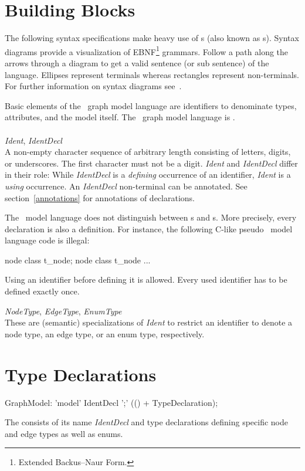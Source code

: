 \section{Building Blocks}
\label{modelbb}

\begin{note}
The following syntax specifications make heavy use of s (also known as s). Syntax diagrams provide a visualization of EBNF\footnote{Extended Backus–Naur Form.} grammars. Follow a path along the arrows through a diagram to get a valid sentence (or sub sentence) of the language. Ellipses represent terminals whereas rectangles represent non-terminals. For further information on syntax diagrams see~\cite{MMJW:91}.
\end{note}
Basic elements of the \GrG\ graph model language are identifiers to denominate types, attributes, and the model itself. The \GrG\ graph model language is .\\
\\
\emph{Ident}, \emph{IdentDecl}\\ \nopagebreak
A non-empty character sequence of arbitrary length consisting of letters, digits, or underscores. The first character must not be a digit. \emph{Ident} and \emph{IdentDecl} differ in their role: While \emph{IdentDecl} is a \emph{defining} occurrence of an identifier, \emph{Ident} is a \emph{using} occurrence. An \emph{IdentDecl} non-terminal can be annotated. See section~\ref{annotations} for annotations of declarations.
\begin{note}
\label{note:modeldecl}
  The \GrG\ model language does not distinguish between s and s. More precisely, every declaration is also a definition. For instance, the following C-like pseudo \GrG\ model language code is illegal:
\begin{grgen}
node class t_node;
node class t_node {
  ...
}
\end{grgen}
Using an identifier before defining it is allowed. Every used identifier has to be defined exactly once.
\end{note}
\pagebreak
\emph{NodeType}, \emph{EdgeType}, \emph{EnumType}\\ \nopagebreak
These are (semantic) specializations of \emph{Ident} to restrict an identifier to denote a node type, an edge type, or an enum type, respectively.

\section{Type Declarations}
\begin{rail}
  GraphModel: 'model' IdentDecl ';' (() + TypeDeclaration);
\end{rail}
The  consists of its name \emph{IdentDecl} and type declarations defining specific node and edge types as well as enums.


